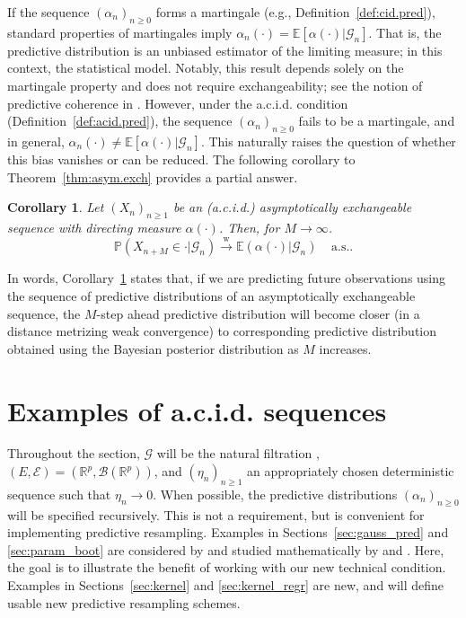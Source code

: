 \documentclass{article}
\newtheorem{corollary}{Corollary}
\theoremstyle{definition}
\renewcommand{\&}{and}
\begin{document}
If the sequence $(\alpha_n)_{n \geq 0}$ forms a martingale (e.g., Definition~\ref{def:cid.pred}), standard properties of martingales imply $\alpha_n(\cdot)=\mathbb{E}[\alpha(\cdot) | \mathcal{G}_n]$. That is, the predictive distribution is an unbiased estimator of the limiting measure; in this context, the statistical model. Notably, this result depends solely on the martingale property and does not require exchangeability; see the notion of predictive coherence in \cite{fong2021martingale}. However, under the a.c.i.d. condition (Definition~\ref{def:acid.pred}), the sequence $(\alpha_n)_{n \geq 0}$ fails to be a martingale, and in general, $\alpha_n(\cdot) \neq \mathbb{E}[\alpha(\cdot)| \mathcal{G}_n]$. This naturally raises the question of whether this bias vanishes or can be reduced. The following corollary to Theorem~\ref{thm:asym.exch} provides a partial answer.

\begin{corollary}\label{corollary1}
Let $(X_{n})_{n\geq 1
}$ be an (a.c.i.d.) asymptotically exchangeable sequence with directing measure $\alpha(\cdot)$. Then, for $M\to \infty$.
\begin{equation} \label{eq:conv.ind}
    \mathbb{P}\left(X_{n+M}\in \cdot  |\mathcal{G}_{n}\right) \stackrel{\text{w}}{\to} \mathbb{E}\left(\alpha(\cdot) | \mathcal{G}_{n} \right) \ \ \ \ \ \text{a.s.}.
\end{equation}
\end{corollary}

In words, Corollary~\ref{corollary1} states that, if we are predicting future observations using the sequence of predictive distributions of an asymptotically exchangeable sequence, the $M$-step ahead predictive distribution will become closer (in a distance metrizing weak convergence) to corresponding predictive distribution obtained using the Bayesian posterior distribution as $M$ increases. %


\section{Examples of  a.c.i.d. sequences} \label{sec:examples}

Throughout the section, $\mathcal{G}$ will be the natural filtration%
, $(E,\mathcal{E})=(\mathbb{R}^{p},\mathcal{B}(\mathbb{R}^{p}))$, and $(\eta_{n})_{n \geq 1}$ an appropriately chosen deterministic sequence such that $\eta_n \to 0$. When possible, the predictive distributions $(\alpha_n)_{n \geq 0}$ will be specified recursively. This is not a requirement, but is convenient for implementing predictive resampling.  Examples in Sections~\ref{sec:gauss_pred} and \ref{sec:param_boot} are considered by \cite{holmes2023statistical} and studied mathematically by \cite{garelli2024asymptotics} and \cite{fong2024asymptotics}. Here, the goal is to illustrate the benefit of working with our new technical condition. Examples in Sections~\ref{sec:kernel} and \ref{sec:kernel_regr} are new, and will define usable new predictive resampling schemes. 
\end{document}
